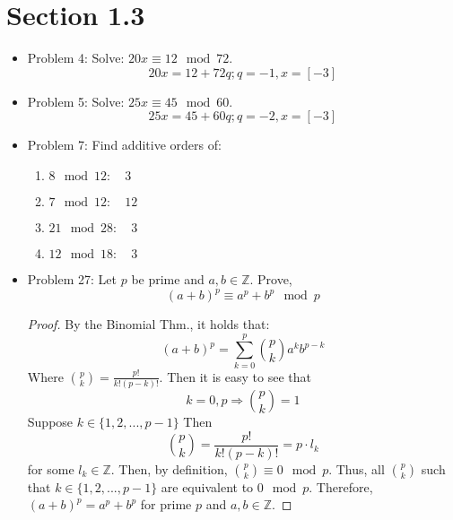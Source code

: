 \documentclass[hidelinks,12pt]{article}
\title{\scalebox{2}{Math 531 Homework 2}}
\author{\scalebox{1.5}{Theo Koss}}
\date{February 2021}
\newcommand{\Z}{\mathbb{Z}}
\begin{document}
\graphicspath{{/home/theo/Documents/GitHub/Math-Homeworks/Math 531/Random/}}
\maketitle
\section{Section 1.3}
\begin{itemize}
    \item Problem 4: Solve: $20x\equiv12\mod{72}$.$$20x=12+72q;q=-1,x=[-3]$$
    \item Problem 5: Solve: $25x\equiv45\mod{60}$.$$25x=45+60q;q=-2,x=[-3]$$
    \item Problem 7: Find additive orders of:\begin{enumerate}[label=\alph*.]
        \item $8\mod{12}:\quad3$
        \item $7\mod{12}:\quad12$
        \item $21\mod{28}:\quad3$
        \item $12\mod{18}:\quad3$
    \end{enumerate}
    \item Problem 27: Let $p$ be prime and $a,b\in\Z$. Prove, $$(a+b)^p\equiv a^p+b^p\mod{p}$$
    \begin{proof}
    By the Binomial Thm., it holds that:$$(a+b)^p=\sum_{k=0}^{p}{p\choose k}a^{k}b^{p-k}$$
Where ${p \choose k}=\frac{p!}{k!(p-k)!}$.
Then it is easy to see that $$k=0,p\Longrightarrow{p \choose k}=1$$Suppose $k\in\{1,2,...,p-1\}$ Then $${p \choose k}=\frac{p!}{k!(p-k)!}=p\cdot{l_k}$$ for some $l_{k}\in\mathbb{Z}$.
Then, by definition, ${p \choose k}\equiv0\mod{p}$.
\newline Thus, all ${p \choose k}$ such that $k\in\{1,2,...,p-1\}$ are equivalent to $0\mod{p}$.
Therefore, $(a+b)^p=a^p+b^p$ for prime $p$ and $a,b\in\mathbb{Z}$. 
    \end{proof}
\end{itemize}
\end{document}
